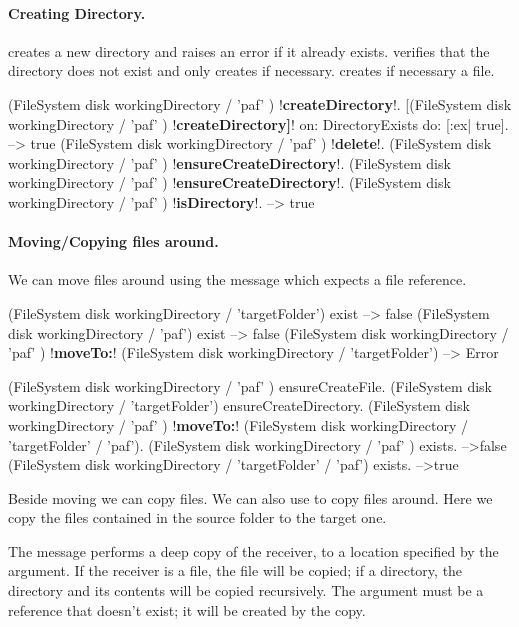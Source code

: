 \documentclass[a4paper,10pt,twoside]{book}
\begin{document}
\paragraph{Creating Directory.}
 creates a new directory and raises an error if it already exists. 
 verifies that the directory does not exist and only creates if necessary.
 creates if necessary a file.
 
 
\begin{code}{} 
(FileSystem disk workingDirectory / 'paf' ) !\textbf{createDirectory}!.
[(FileSystem disk workingDirectory / 'paf' ) !\textbf{createDirectory]}! on: DirectoryExists do: [:ex| true].
	--> true
(FileSystem disk workingDirectory / 'paf' ) !\textbf{delete}!.
(FileSystem disk workingDirectory / 'paf' ) !\textbf{ensureCreateDirectory}!.
(FileSystem disk workingDirectory / 'paf' ) !\textbf{ensureCreateDirectory}!.
(FileSystem disk workingDirectory / 'paf' ) !\textbf{isDirectory}!.
  --> true
\end{code}

\paragraph{Moving/Copying files around.}

We can move files around using the message  which expects a file reference. 
\begin{code}{}
(FileSystem disk workingDirectory / 'targetFolder') exist
  --> false
(FileSystem disk workingDirectory / 'paf') exist
  --> false
(FileSystem disk workingDirectory / 'paf' ) !\textbf{moveTo:}! (FileSystem disk workingDirectory / 'targetFolder')
 --> Error

(FileSystem disk workingDirectory / 'paf' ) ensureCreateFile.
(FileSystem disk workingDirectory / 'targetFolder') ensureCreateDirectory. 
(FileSystem disk workingDirectory / 'paf' ) !\textbf{moveTo:}! (FileSystem disk workingDirectory / 'targetFolder' / 'paf').
(FileSystem disk workingDirectory / 'paf' ) exists.
	-->false
(FileSystem disk workingDirectory / 'targetFolder' / 'paf') exists.
	-->true
\end{code}

Beside moving we can copy files. 
We can also use  to copy files around. Here we copy the files contained in the source folder to the target one. 

The message  performs a deep copy of the receiver, to a location specified by the argument. If the receiver is a file, the file will be copied; if a directory, the directory and its contents will be copied recursively. The argument must be a reference that doesn't exist; it will be created by the copy.
\end{document}
